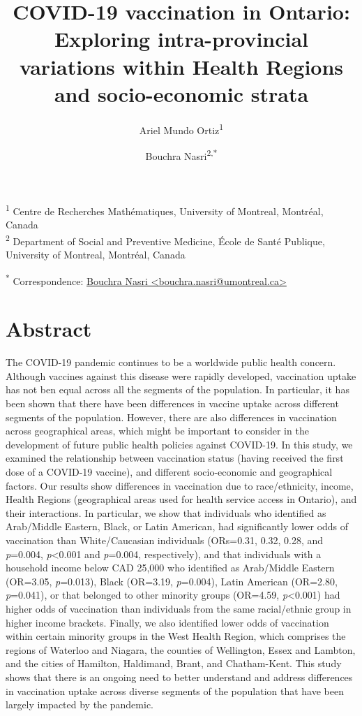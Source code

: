 \documentclass[
  letterpaper,
  DIV=11,
  numbers=noendperiod]{scrartcl}
\title{\textbf{COVID-19 vaccination in Ontario: Exploring
intra-provincial variations within Health Regions and socio-economic
strata}}
\author{Ariel Mundo Ortiz\textsuperscript{1} \and Bouchra
Nasri\textsuperscript{2,*}}
\date{}
\begin{document}
\maketitle
\ifdefined\Shaded\renewenvironment{Shaded}{\begin{tcolorbox}[boxrule=0pt, interior hidden, borderline west={3pt}{0pt}{shadecolor}, enhanced, breakable, sharp corners, frame hidden]}{\end{tcolorbox}}\fi

\textsuperscript{1} Centre de Recherches Mathématiques, University of
Montreal, Montréal, Canada\\
\textsuperscript{2} Department of Social and Preventive Medicine, École
de Santé Publique, University of Montreal, Montréal, Canada

\textsuperscript{*} Correspondence:
\href{mailto:bouchra.nasri@umontreal.ca}{Bouchra Nasri
\textless{}bouchra.nasri@umontreal.ca\textgreater{}}

\hypertarget{abstract}{%
\section{Abstract}\label{abstract}}

The COVID-19 pandemic continues to be a worldwide public health concern.
Although vaccines against this disease were rapidly developed,
vaccination uptake has not ben equal across all the segments of the
population. In particular, it has been shown that there have been
differences in vaccine uptake across different segments of the
population. However, there are also differences in vaccination across
geographical areas, which might be important to consider in the
development of future public health policies against COVID-19. In this
study, we examined the relationship between vaccination status (having
received the first dose of a COVID-19 vaccine), and different
socio-economic and geographical factors. Our results show differences in
vaccination due to race/ethnicity, income, Health Regions (geographical
areas used for health service access in Ontario), and their
interactions. In particular, we show that individuals who identified as
Arab/Middle Eastern, Black, or Latin American, had significantly lower
odds of vaccination than White/Caucasian individuals (ORs=0.31, 0.32,
0.28, and \emph{p}=0.004, \emph{p}\textless0.001 and \emph{p}=0.004,
respectively), and that individuals with a household income below CAD
25,000 who identified as Arab/Middle Eastern (OR=3.05, \emph{p}=0.013),
Black (OR=3.19, \emph{p}=0.004), Latin American (OR=2.80,
\emph{p}=0.041), or that belonged to other minority groups (OR=4.59,
\emph{p}\textless0.001) had higher odds of vaccination than individuals
from the same racial/ethnic group in higher income brackets. Finally, we
also identified lower odds of vaccination within certain minority groups
in the West Health Region, which comprises the regions of Waterloo and
Niagara, the counties of Wellington, Essex and Lambton, and the cities
of Hamilton, Haldimand, Brant, and Chatham-Kent. This study shows that
there is an ongoing need to better understand and address differences in
vaccination uptake across diverse segments of the population that have
been largely impacted by the pandemic.
\end{document}
